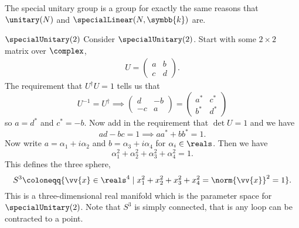 \documentclass[fleqn]{NotesClass}
\newcommand{\ident}{1}
\newcommand{\sphere}[1][n]{S^{#1}}
\newcommand{\hermit}{\dagger}
\renewcommand{\field}{\symbb{k}}
\begin{document}
    The special unitary group is a group for exactly the same reasons that \(\unitary(N)\) and \(\specialLinear(N, \field)\) are.
    
    \begin{exm}{\(\specialUnitary(2)\)}{}
        Consider \(\specialUnitary(2)\).
        Start with some \(2\times 2\) matrix over \(\complex\),
        \begin{align}
            U = 
            \begin{pmatrix}
                a & b\\ c & d
            \end{pmatrix}
            .
        \end{align}
        The requirement that \(U^\hermit U = \ident\) tells us that
        \begin{equation}
            U^{-1} = U^{\hermit} \implies 
            \begin{pmatrix}
                d & -b\\
                -c & a
            \end{pmatrix}
            =
            \begin{pmatrix}
                a^* & c^*\\
                b^* & d^*
            \end{pmatrix}
        \end{equation}
        so \(a = d^*\) and \(c^* = -b\).
        Now add in the requirement that \(\det U = 1\) and we have
        \begin{equation}
            ad - bc = 1 \implies aa^* + bb^* = 1.
        \end{equation}
        Now write \(a = \alpha_1 + i \alpha_2\) and \(b = \alpha_3 + i\alpha_4\) for \(\alpha_i \in \reals\).
        Then we have
        \begin{equation}
            \alpha_1^2 + \alpha_2^2 + \alpha_3^2 + \alpha_4^2 = 1.
        \end{equation}
        This defines the three sphere,
        \begin{equation}
            \sphere[3] \coloneqq \{\vv{x} \in \reals^4 \mid x_1^2 + x_2^2 + x_3^2 + x_4^2 = \norm{\vv{x}}^2 = 1\}.
        \end{equation}
        This is a three-dimensional real manifold which is the parameter space for \(\specialUnitary(2)\).
        Note that \(\sphere[3]\) is simply connected, that is any loop can be contracted to a point.
    \end{exm}
    
\end{document}
